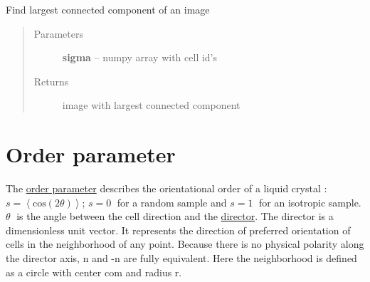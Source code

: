 \documentclass[letterpaper,10pt,english]{sphinxmanual}
\begin{document}

\begin{fulllineitems}
\label{AnalysisUtils:AnalysisUtils.getLCC}
Find largest connected component of an image
\begin{quote}\begin{description}
\item[{Parameters}] \leavevmode
\textbf{sigma} -- numpy array with cell id's

\item[{Returns}] \leavevmode
image with largest connected component

\end{description}\end{quote}

\end{fulllineitems}



\section{Order parameter}
\label{AnalysisUtils:order-parameter}
The \href{http://en.wikipedia.org/wiki/Liquid\_crystal\#Order\_parameter}{order parameter} describes the orientational order of a liquid crystal : $s = \left \langle \text{cos}(2 \theta)\right \rangle$; $s = 0\;$ for a random sample and $s = 1\;$ for an isotropic sample. $\theta\;$ is the angle between the cell direction and the \href{http://en.wikipedia.org/wiki/Liquid\_crystal\#Director}{director}. The director is a dimensionless unit vector. It represents the direction of preferred orientation of cells in the neighborhood of any point. Because there is no physical polarity along the director axis, n and -n are fully equivalent. Here the neighborhood is defined as a circle with center com and radius r.
\end{document}
